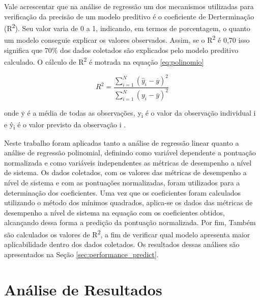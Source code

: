 \documentclass[[10pt,journal]{IEEEtran}
\newcommand{\textoverline}[1]{$\overline{\mbox{#1}}$}
\begin{document}
Vale acrescentar que na análise de regressão um dos mecanismos utilizadas para verificação da precisão de um modelo preditivo é o coeficiente de Derterminação (R\textsuperscript{2}). Seu valor varia de 0 a 1, indicando, em termos de porcentagem, o quanto um modelo conseguie explicar os valores observados. Assim, se o R\textsuperscript{2} é 0,70 isso significa que 70\% dos dados coletados são explicados pelo modelo preditivo calculado. O cálculo de R\textsuperscript{2} é motrada na equação \ref{eq:polinomio}

\begin{equation}
\label{eq:polinomio}  
R^2 = \frac{ \sum\limits_{i=1}^{N}(\hat{y}_i - \overline{y})^2}{\sum\limits_{i=1}^{N}(y_i - \overline{y})^2}
\end{equation} 

onde \textoverline{y} é a média de todas as observações, y\textsubscript{i} é o valor da observação individual i e \^{y}\textsubscript{i} é o valor previsto da observação i \cite{hair}.

Neste trabalho foram aplicadas tanto a análise de regressão linear quanto a análise de regressão polinomial, definindo como variável dependente a pontuação normalizada e como variáveis independentes as métricas de desempenho a nível de sistema. Os dados coletados, com os valores das métricas de desempenho a nível de sistema e com as pontuações normalizadas, foram utilizados para a  determinação dos coeficientes. Uma vez que os coeficientes foram calculados utilizando o método dos mínimos quadrados, aplica-se os dados das métricas de desempenho a nível de sistema na equação com os coeficientes obtidos, alcançando dessa forma a predição da pontuação normalizada. Por fim, Também são calculados os valores de R\textsuperscript{2}, a fim de verificar qual modelo apresenta maior aplicabilidade dentro dos dados coletados. Os resultados dessas análises são apresentados na Seção \ref{sec:performance_predict}.

\section{Análise de Resultados}
\label{cap:resultados}
\end{document}
